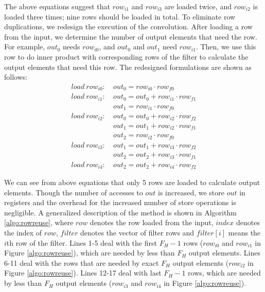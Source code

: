 The above equations suggest that $row_{i1}$ and $row_{i3}$ are loaded twice, and $row_{i2}$ is loaded three times; nine rows should be loaded in total. To eliminate row duplications, we redesign the execution of the convolution. After loading a row from the input, we determine the number of output elements that need the row. For example, $out_0$ needs $row_{i0}$, and $out_0$ and $out_1$ need $row_{i1}$. Then, we use
this row to do inner product with corresponding rows of the filter to calculate the output elements that need this row. The redesigned formulations are shown as follows:
\begin{equation}\nonumber
\begin{aligned}
load\ row_{i0}:
&\ out_0=row_{i0} \cdot row_{f0} \\
load\ row_{i1}:
&\ out_0 = out_0+row_{i1} \cdot row_{f1}\\
&\ out_1=row_{i1} \cdot row_{f0}\\
load\ row_{i2}:
&\ out_0 = out_0+row_{i2} \cdot row_{f2}\\
&\ out_1 = out_1+row_{i2} \cdot row_{f1}\\
&\ out_{2}=row_{i2} \cdot row_{f0}\\
load\ row_{i3}:
&\ out_1=out_1+row_{i3} \cdot row_{f2} \\
&\ out_2=out_2+row_{i3} \cdot row_{f1}\\
load\ row_{i4}:
&\ out_2=out_2+row_{i4} \cdot row_{f2}
\end{aligned}	
\end{equation}



We can see from above equations that only 5 rows are loaded to calculate output elements. {\color{red}Though the number of accesses to $out$ is increased, we store $out$ in registers and the overhead for the increased number of store operations is negligible.} A generalized description of the method is
shown in Algorithm \ref{algo:rowreuse}, where $row$ denotes the row loaded from the input, $index$ denotes the index of $row$, $filter$ denotes
the vector of filter rows and $filter[i]$ means the $i$th row of the filter. Lines 1-5 deal with the first $F_H-1$ rows ($row_{i0}$ and $row_{i1}$ in Figure \ref{algo:rowreuse}), which
are needed by less than $F_H$ output elements. Lines 6-11 deal with the rows that are needed by exact $F_H$ output elements ($row_{i2}$ in
Figure \ref{algo:rowreuse}). Lines 12-17 deal with last $F_H-1$ rows, which are needed by less than $F_H$ output elements ($row_{i3}$
and $row_{i4}$ in Figure \ref{algo:rowreuse}).

